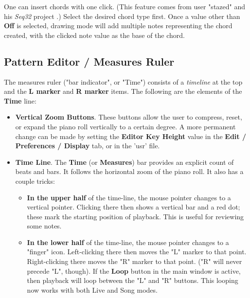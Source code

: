    One can insert chords with one click.
   (This feature comes from user "stazed"
   and his \textsl{Seq32} project \cite{seq32}.)
   Select the desired chord type first.
   Once a value other than \textbf{Off} is selected,
   drawing mode will add multiple notes representing the chord
   created, with the clicked note value as the base of the chord.

\subsection{Pattern Editor / Measures Ruler}
\label{subsec:pattern_editor_time}

   The measures ruler ("bar indicator", or "Time")
   consists of a \textsl{timeline} at the top and the 
   \textbf{L marker} and \textbf{R marker} items.
   The following are the elements of the \textbf{Time} line:

   \begin{itemize}
      \item \textbf{Vertical Zoom Buttons}.
         These buttons allow the user to compress, reset, or expand the
         piano roll vertically to a certain degree.  A more permanent change
         can be made by setting the \textbf{Editor Key Height} value in
         the \textbf{Edit / Preferences / Display} tab, or in the 'usr' file.
      \item \textbf{Time Line}.
         The \textbf{Time} (or \textbf{Measures}) bar provides an explicit
         count of beats and bars.
         It follows the horizontal zoom of the piano roll.
         It also has a couple tricks:
         \begin{itemize}
            \item \textbf{In the upper half} of the time-line,
               the mouse pointer changes to a vertical pointer.
               Clicking there then shows a vertical bar and a red dot; these mark
               the starting position of playback.
               This is useful for reviewing some notes.
            \item \textbf{In the lower half} of the time-line,
               the mouse pointer changes to a "finger" icon.
               Left-clicking there then moves the "L" marker to that point.
               Right-clicking there moves the "R" marker to that point.
               ("R" will never precede "L", though).
               If the \textbf{Loop} button in the main window is active, then
               playback will loop between the "L" and "R" buttons.
               This looping now works with both Live and Song modes.
         \end{itemize}
   \end{itemize}

